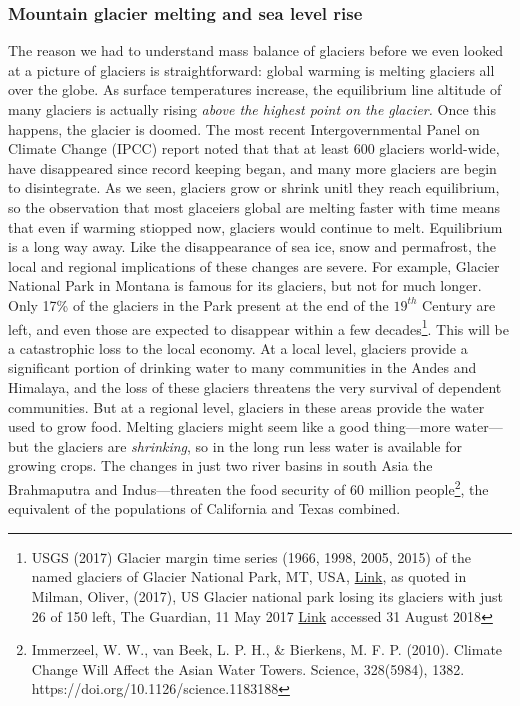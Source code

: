 \documentclass[amstex,12pt]{book}
\begin{document}
\subsubsection{Mountain glacier melting and sea level rise}
The reason we had to understand mass balance of glaciers before we even looked at a picture of glaciers is straightforward: global warming is melting glaciers all over the globe. As surface temperatures increase, the equilibrium line altitude of many glaciers is actually rising \emph{above the highest point on the glacier.} Once this happens, the glacier is doomed. The most recent Intergovernmental Panel on Climate Change (IPCC) report noted that that at least 600 glaciers world-wide, have disappeared since record keeping began, and many more glaciers are begin to disintegrate. As we seen, glaciers grow or shrink unitl they reach equilibrium, so the observation that most glaceiers global are melting faster with time means that even if warming stiopped now, glaciers would continue to melt. Equilibrium is a long way away. Like the disappearance of sea ice, snow and permafrost, the local and regional implications of these changes are severe. For example, Glacier National Park in Montana is famous for its glaciers, but not for much longer. Only 17\% of the glaciers in the Park present at the end of the $19^{th}$ Century are left, and even those are expected to disappear within a few decades\footnote{USGS (2017) Glacier margin time series (1966, 1998, 2005, 2015) of the named glaciers of Glacier National Park, MT, USA, \href{doi:10.5066/F7P26WB1}{Link}, as quoted in Milman, Oliver, (2017), US Glacier national park losing its glaciers with just 26 of 150 left, The Guardian, 11 May 2017 \href{https://www.theguardian.com/environment/2017/may/11/us-glacier-national-park-is-losing-its-glaciers-with-just-26-of-150-left}{Link} accessed 31 August 2018 }. This will be a catastrophic loss to the local economy. At a local level, glaciers provide a significant portion of drinking water to many communities in the Andes and Himalaya, and the loss of these glaciers threatens the very survival of dependent communities. But at a regional level, glaciers in these areas provide the water used to grow food. Melting glaciers might seem like a good thing---more water---but the glaciers are \emph{shrinking}, so in the long run less water is available for growing crops. The changes in just two river basins in south Asia the Brahmaputra and Indus---threaten the food security of 60 million people\footnote{Immerzeel, W. W., van Beek, L. P. H., \& Bierkens, M. F. P. (2010). Climate Change Will Affect the Asian Water Towers. Science, 328(5984), 1382. https://doi.org/10.1126/science.1183188
}, the equivalent of the populations of California and Texas combined.\\   
\end{document}
